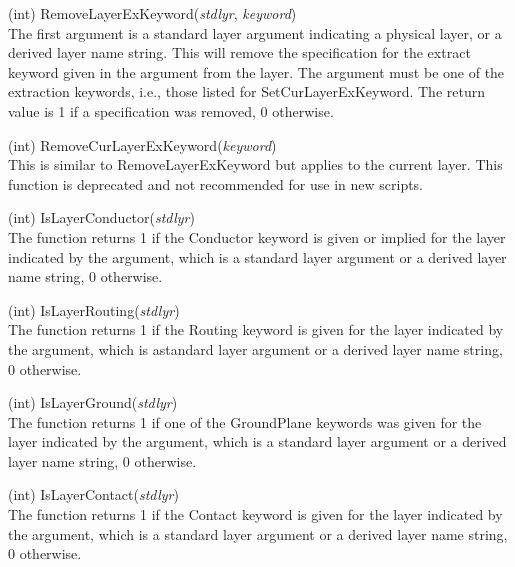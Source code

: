 \begin{description}
\item{(int) \vt RemoveLayerExKeyword({\it stdlyr\/}, {\it keyword\/})}\\
The first argument is a standard layer argument indicating a physical
layer, or a derived layer name string.  This will remove the
specification for the extract keyword given in the argument from the
layer.  The argument must be one of the extraction keywords, i.e.,
those listed for {\vt SetCurLayerExKeyword}.  The return value is 1 if
a specification was removed, 0 otherwise.

\item{(int) \vt RemoveCurLayerExKeyword({\it keyword\/})}\\
This is similar to {\vt RemoveLayerExKeyword} but applies to the
current layer.  This function is deprecated and not recommended for
use in new scripts.

\item{(int) \vt IsLayerConductor({\it stdlyr\/})}\\
The function returns 1 if the {\et Conductor} keyword is given or
implied for the layer indicated by the argument, which is a standard
layer argument or a derived layer name string, 0 otherwise.

\item{(int) \vt IsLayerRouting({\it stdlyr\/})}\\
The function returns 1 if the {\et Routing} keyword is given for the
layer indicated by the argument, which is astandard layer argument or
a derived layer name string, 0 otherwise.

\item{(int) \vt IsLayerGround({\it stdlyr\/})}\\
The function returns 1 if one of the {\et GroundPlane} keywords was
given for the layer indicated by the argument, which is a standard
layer argument or a derived layer name string, 0 otherwise.

\item{(int) \vt IsLayerContact({\it stdlyr\/})}\\
The function returns 1 if the {\et Contact} keyword is given for the
layer indicated by the argument, which is a standard layer argument or
a derived layer name string, 0 otherwise.


\end{description}

